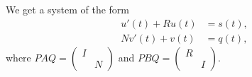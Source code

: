 	\begin{frame}
%		
%		
		We get a system of the form
		\begin{equation}
			\label{transformed-DAE-const-coeff}
			\begin{aligned}
				u'(t) + Ru(t) &= s(t), \\
				Nv'(t) + v(t) &= q(t),
			\end{aligned}
		\end{equation}
		where $PAQ = 
		\left( 
		\begin{matrix}
			I & \\
			& N
		\end{matrix} 
		\right)$
		and $PBQ = 
		\left( 
		\begin{matrix}
			R & \\
			& I
		\end{matrix} 
		\right)$.
	\end{frame}
	

